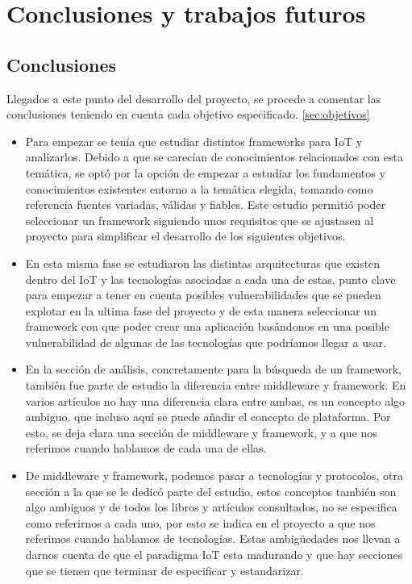 \chapter{Conclusiones y trabajos futuros}

\section{Conclusiones}

Llegados a este punto del desarrollo del proyecto, se procede a comentar las conclusiones teniendo en cuenta cada objetivo especificado. \ref{sec:objetivos}

\begin{itemize}
    \item Para empezar se tenía que estudiar distintos frameworks para IoT y analizarlos. Debido a que se carecían de conocimientos relacionados con esta temática, se optó por la opción de empezar a estudiar los fundamentos y conocimientos existentes entorno a la temática elegida, tomando como referencia fuentes variadas, válidas y fiables. Este estudio permitió poder seleccionar un framework siguiendo unos requisitos que se ajustasen al proyecto para simplificar el desarrollo de los siguientes objetivos.
    \item En esta misma fase se estudiaron las distintas arquitecturas que existen dentro del IoT y las tecnologías asociadas a cada una de estas, punto clave para empezar a tener en cuenta posibles vulnerabilidades que se pueden explotar en la ultima fase del proyecto y de esta manera seleccionar un framework con que poder crear una aplicación basándonos en una posible vulnerabilidad de algunas de las tecnologías que podríamos llegar a usar.
    \item En la sección de análisis, concretamente para la búsqueda de un framework, también fue parte de estudio la diferencia entre middleware y framework. En varios artículos no hay una diferencia clara entre ambas, es un concepto algo ambiguo, que incluso aquí se puede añadir el concepto de plataforma. Por esto, se deja clara una sección de middleware y framework, y a que nos referimos cuando hablamos de cada una de ellas.
    \item De middleware y framework, podemos pasar a tecnologías y protocolos, otra sección a la que se le dedicó parte del estudio, estos conceptos también son algo ambiguos y de todos los libros y artículos consultados, no se especifica como referirnos a cada uno, por esto se indica en el proyecto a que nos referimos cuando hablamos de tecnologías. Estas ambigüedades nos llevan a darnos cuenta de que el paradigma IoT esta madurando y que hay secciones que se tienen que terminar de especificar y estandarizar.

\end{itemize}
